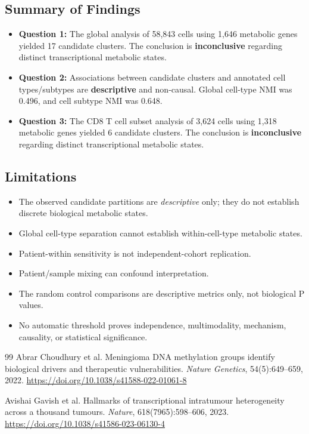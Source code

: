 \documentclass[11pt,a4paper]{article}
\begin{document}
\subsection{Summary of Findings}
\begin{itemize}
    \item \textbf{Question 1:} The global analysis of 58,843 cells using 1,646 metabolic genes yielded 17 candidate clusters. The conclusion is \textbf{inconclusive} regarding distinct transcriptional metabolic states.
    \item \textbf{Question 2:} Associations between candidate clusters and annotated cell types/subtypes are \textbf{descriptive} and non-causal. Global cell-type NMI was 0.496, and cell subtype NMI was 0.648.
    \item \textbf{Question 3:} The CD8 T cell subset analysis of 3,624 cells using 1,318 metabolic genes yielded 6 candidate clusters. The conclusion is \textbf{inconclusive} regarding distinct transcriptional metabolic states.
\end{itemize}

\subsection{Limitations}
\begin{itemize}
    \item The observed candidate partitions are \textit{descriptive} only; they do not establish discrete biological metabolic states.
    \item Global cell-type separation cannot establish within-cell-type metabolic states.
    \item Patient-within sensitivity is not independent-cohort replication.
    \item Patient/sample mixing can confound interpretation.
    \item The random control comparisons are descriptive metrics only, not biological P values.
    \item No automatic threshold proves independence, multimodality, mechanism, causality, or statistical significance.
\end{itemize}

\begin{thebibliography}{99}
Abrar Choudhury et al.
\newblock Meningioma DNA methylation groups identify biological drivers and therapeutic vulnerabilities.
\newblock \emph{Nature Genetics}, 54(5):649--659, 2022.
\newblock \url{https://doi.org/10.1038/s41588-022-01061-8}

Avishai Gavish et al.
\newblock Hallmarks of transcriptional intratumour heterogeneity across a thousand tumours.
\newblock \emph{Nature}, 618(7965):598--606, 2023.
\newblock \url{https://doi.org/10.1038/s41586-023-06130-4}
\end{thebibliography}
\end{document}
